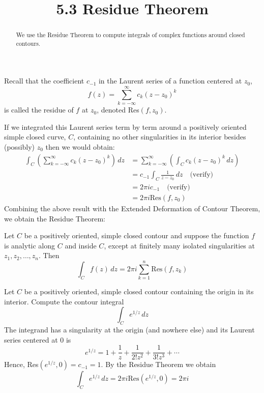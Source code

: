 \documentclass[handout]{ximera}
\title{5.3 Residue Theorem}
\begin{document}
\begin{abstract}
We use the Residue Theorem to compute integrals of complex functions around closed contours.
\end{abstract}

\maketitle


Recall that the coefficient $c_{-1}$ in the Laurent series of a function centered at $z_0$,
\[
f(z) = \sum_{k=-\infty}^\infty c_k (z-z_0)^k
\]
is called the residue of $f$ at $z_0$, denoted Res$(f,z_0)$.

If we integrated this Laurent series term by term around a positively oriented simple closed curve, $C$, containing no other 
singularities in its interior besides (possibly) $z_0$ then we would obtain:
\begin{align*}
\int_C \left(\sum_{k=-\infty}^\infty c_k (z-z_0)^k \right)\, dz &= \sum_{k=-\infty}^\infty \left( \int_C c_k (z-z_0)^k \, dz \right)\\
&= c_{-1} \int_C \frac{1}{z-z_0} \, dz \quad \text{(verify)}\\
&= 2\pi i c_{-1} \quad \text{(verify)}\\
&= 2\pi i \text{Res}(f, z_0)
\end{align*}
Combining the above result with the Extended Deformation of Contour Theorem, we obtain the Residue Theorem:

\begin{theorem}
Let $C$ be a positively oriented, simple closed contour and suppose the function $f$ is analytic along $C$ and inside $C$,
except at finitely many isolated singularities at $z_1, z_2, \dots, z_n$. Then
\[
\int_C f(z) \, dz = 2\pi i \sum_{k=1}^n \text{Res}(f,z_k)
\]
\end{theorem}


\begin{example}[example 1a]
Let $C$ be a positively oriented, simple closed contour containing the origin in its interior.
Compute the contour integral
\[
\int_C e^{1/z} \, dz
\]
The integrand has a singularity at the origin (and nowhere else) and its Laurent series centered at $0$ is
\[
e^{1/z} = 1 + \frac{1}{z} + \frac{1}{2!z^2} + \frac{1}{3! z^3} + \cdots
\]
Hence, Res$(e^{1/z},0) = c_{-1} = 1$. By the Residue Theorem we obtain
\[
\int_C e^{1/z} \, dz = 2\pi i \text{Res}(e^{1/z}, 0) = 2\pi i
\]
\end{example}
\end{document}
